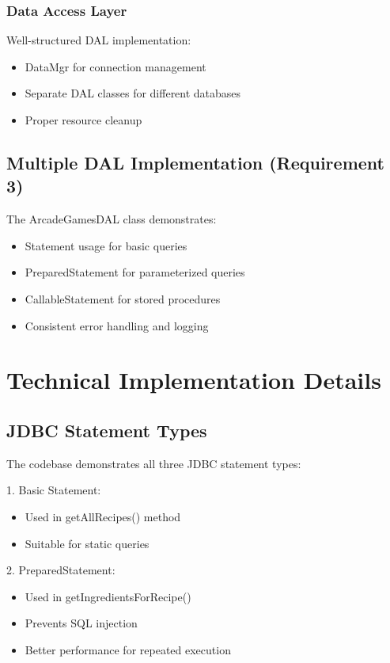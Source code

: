 \documentclass[12pt]{article}
\begin{document}
\subsubsection{Data Access Layer}
Well-structured DAL implementation:
\begin{itemize}
    \item DataMgr for connection management
    \item Separate DAL classes for different databases
    \item Proper resource cleanup
\end{itemize}

\subsection{Multiple DAL Implementation (Requirement 3)}
The ArcadeGamesDAL class demonstrates:
\begin{itemize}
    \item Statement usage for basic queries
    \item PreparedStatement for parameterized queries
    \item CallableStatement for stored procedures
    \item Consistent error handling and logging
\end{itemize}

\section{Technical Implementation Details}

\subsection{JDBC Statement Types}
The codebase demonstrates all three JDBC statement types:

1. Basic Statement:
\begin{itemize}
    \item Used in getAllRecipes() method
    \item Suitable for static queries
\end{itemize}

2. PreparedStatement:
\begin{itemize}
    \item Used in getIngredientsForRecipe()
    \item Prevents SQL injection
    \item Better performance for repeated execution
\end{itemize}
\end{document}
